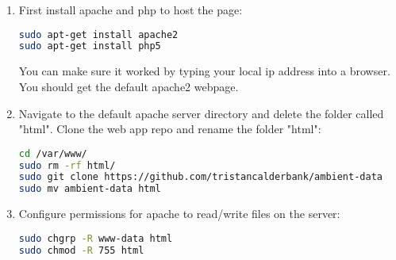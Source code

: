 \documentclass[a4paper,12pt]{article}
\begin{document}
\begin{enumerate}

\item First install apache and php to host the page:

\begin{lstlisting}[language=bash]
sudo apt-get install apache2
sudo apt-get install php5
\end{lstlisting}

You can make sure it worked by typing your local ip address into a browser. You should get the default apache2 webpage.

\item Navigate to the default apache server directory and delete the folder called "html". Clone the web app repo and rename the folder "html":

\begin{lstlisting}[language=bash]
cd /var/www/
sudo rm -rf html/
sudo git clone https://github.com/tristancalderbank/ambient-data
sudo mv ambient-data html
\end{lstlisting}

\item Configure permissions for apache to read/write files on the server:
\begin{lstlisting}[language=bash]
sudo chgrp -R www-data html
sudo chmod -R 755 html
\end{lstlisting}

\end{enumerate}
\end{document}
